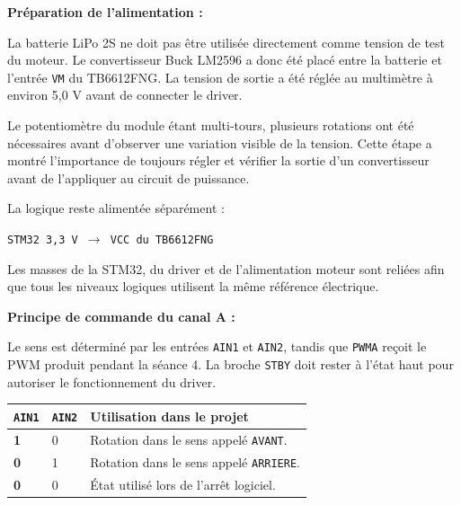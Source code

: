 \documentclass[11pt,a4paper]{article}
\begin{document}
\begin{sessionbox}
		\vspace{0.3cm}
		
		\textbf{Préparation de l'alimentation :}
		
		La batterie LiPo 2S ne doit pas être utilisée directement comme tension de test du moteur. Le convertisseur Buck LM2596 a donc été placé entre la batterie et l'entrée \texttt{VM} du TB6612FNG. La tension de sortie a été réglée au multimètre à environ 5,0 V avant de connecter le driver.
		
		Le potentiomètre du module étant multi-tours, plusieurs rotations ont été nécessaires avant d'observer une variation visible de la tension. Cette étape a montré l'importance de toujours régler et vérifier la sortie d'un convertisseur avant de l'appliquer au circuit de puissance.
		
		\begin{center}
		\end{center}
		
		La logique reste alimentée séparément :
		
		\begin{center}
			\texttt{STM32 3,3 V $\rightarrow$ VCC du TB6612FNG}
		\end{center}
		
		Les masses de la STM32, du driver et de l'alimentation moteur sont reliées afin que tous les niveaux logiques utilisent la même référence électrique.
		
		\vspace{0.3cm}
		
		\textbf{Principe de commande du canal A :}
		
		Le sens est déterminé par les entrées \texttt{AIN1} et \texttt{AIN2}, tandis que \texttt{PWMA} reçoit le PWM produit pendant la séance 4. La broche \texttt{STBY} doit rester à l'état haut pour autoriser le fonctionnement du driver.
		
		\begin{center}
			\begin{tabular}{>{\bfseries}p{3cm}p{3cm}p{6cm}}
				\toprule
				\texttt{AIN1} & \texttt{AIN2} & Utilisation dans le projet \\
				\midrule
				1 & 0 & Rotation dans le sens appelé \texttt{AVANT}. \\
				0 & 1 & Rotation dans le sens appelé \texttt{ARRIERE}. \\
				0 & 0 & État utilisé lors de l'arrêt logiciel. \\
				\bottomrule
			\end{tabular}
		\end{center}
		

\end{sessionbox}
\end{document}
